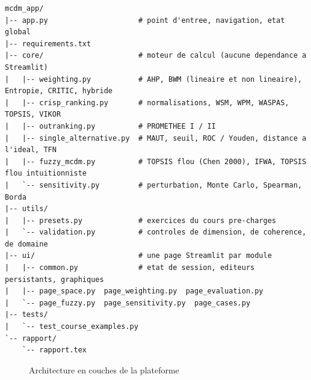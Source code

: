 \documentclass[11pt,a4paper]{report}
\theoremstyle{definition}
\theoremstyle{remark}
\begin{document}
\begin{lstlisting}[language={},numbers=none,caption={Arborescence du projet}]
mcdm_app/
|-- app.py                     # point d'entree, navigation, etat global
|-- requirements.txt
|-- core/                      # moteur de calcul (aucune dependance a Streamlit)
|   |-- weighting.py           # AHP, BWM (lineaire et non lineaire), Entropie, CRITIC, hybride
|   |-- crisp_ranking.py       # normalisations, WSM, WPM, WASPAS, TOPSIS, VIKOR
|   |-- outranking.py          # PROMETHEE I / II
|   |-- single_alternative.py  # MAUT, seuil, ROC / Youden, distance a l'ideal, TFN
|   |-- fuzzy_mcdm.py          # TOPSIS flou (Chen 2000), IFWA, TOPSIS flou intuitionniste
|   `-- sensitivity.py         # perturbation, Monte Carlo, Spearman, Borda
|-- utils/
|   |-- presets.py             # exercices du cours pre-charges
|   `-- validation.py          # controles de dimension, de coherence, de domaine
|-- ui/                        # une page Streamlit par module
|   |-- common.py              # etat de session, editeurs persistants, graphiques
|   |-- page_space.py  page_weighting.py  page_evaluation.py
|   `-- page_fuzzy.py  page_sensitivity.py  page_cases.py
|-- tests/
|   `-- test_course_examples.py
`-- rapport/
    `-- rapport.tex
\end{lstlisting}

\begin{figure}[H]
\centering
{}
\caption{Architecture en couches de la plateforme}\label{fig:archi}
\end{figure}
\end{document}
